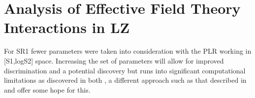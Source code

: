 \chapter{Analysis of Effective Field Theory Interactions in LZ}







%

%

For SR1 fewer parameters were taken into consideration with the PLR working in [S1,logS2] space.
Increasing the set of parameters will allow for improved discrimination and a potential discovery but runs into significant computational limitations as discovered in both \cite{nicolelarsen_thesis_ref, shaunalsum_thesis_ref, billyboxer_thesis_ref}, a different approach such as that described in \cite{flamenest_ref} and \cite{lux_ml_plr_ref} offer some hope for this.